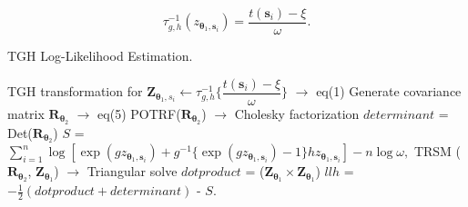 \documentclass[conference]{IEEEtran}
\begin{document}
\begin{equation}
\label{eq:newton}
\tau_{g,h}^{-1}(z_{\bm{\theta}_1, \bm{s}_i}) = \frac{t(\bm{s}_i) -\xi}{\omega}.
\end{equation}

\begin{algorithm}[H]
\footnotesize
\caption{TGH Log-Likelihood Estimation.}
\label{algo:non-gaussian-model}
\begin{algorithmic}[1]
\STATE TGH transformation for $\bm{Z}_{\bm{\theta}_1,s_i} \leftarrow \tau_{g,h}^{-1} \bigg \{ \dfrac{t(\bm{s}_i) - \xi}{\omega} \bigg \}$ $\rightarrow$ eq(1)
\STATE  Generate covariance matrix $\bm{R}_{\bm{\theta}_2}$
$\rightarrow$ eq(5)
\STATE  POTRF($\bm{R}_{\bm{\theta}_2}$)  $\rightarrow$ Cholesky factorization
\STATE $determinant$ = Det($\bm{R}_{\bm{\theta}_2}$)
\STATE $S$ =  $\sum_{i=1}^n \log [ \exp(g z_{\bm{\theta}_1,\bm{s}_i})+g^{-1} \{ \exp(g z_{\bm{\theta}_1,\bm{s}_i}) -1 \} h z_{\bm{\theta}_1,\bm{s}_i}] -n \log \omega, $
\STATE TRSM ($\bm{R}_{\bm{\theta}_2}$, $\bm{Z}_{\bm{\theta}_1}$) $\rightarrow$ Triangular solve
\STATE  $dotproduct$ = (${\bm{Z}_{\bm{\theta}_1}}\times  \bm{Z}_{\bm{\theta}_1}$)
\STATE $llh$ = $-\frac{1}{2} (dotproduct + determinant)$ - $S$.


\end{algorithmic}
\end{algorithm}



%
\end{document}
